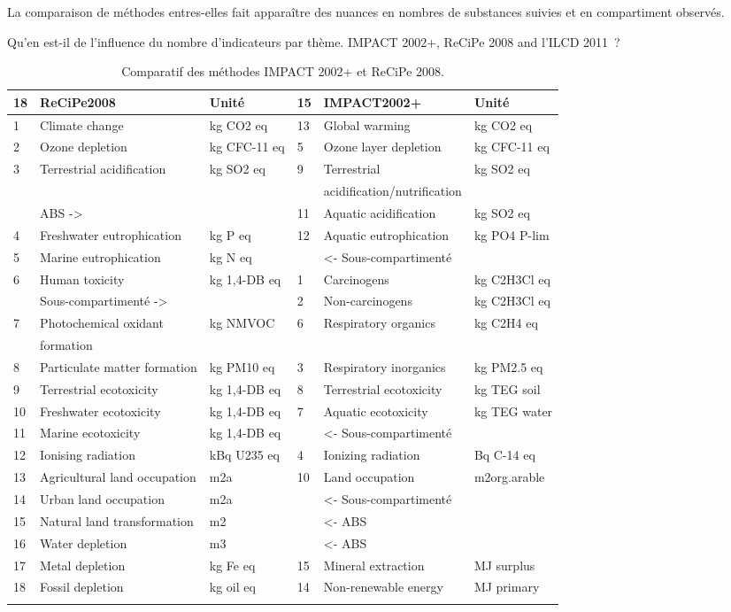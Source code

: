 La comparaison de méthodes entres-elles fait apparaître des nuances en nombres de substances suivies et en compartiment observés.

Qu'en est-il de l'influence du nombre d'indicateurs par thème.
IMPACT 2002+, ReCiPe 2008 and l'ILCD 2011~?~\cite{jolliet_impact_2003, goedkoop_recipe_2009}
    {\scriptsize
    \begin{longtable}{ l p{3cm} l l p{3cm} l}
    \hline
    18 & ReCiPe2008 & Unité & 15 & IMPACT2002+ & Unité  \\
    \hline
    1&Climate change&kg CO2 eq&13&Global warming&kg CO2 eq\\
    2&Ozone depletion&kg CFC-11 eq&5&Ozone layer depletion&kg CFC-11 eq\\
    3&Terrestrial acidification&kg SO2 eq&9&Terrestrial&kg SO2 eq\\
    &&&&acidification/nutrification\\
    &ABS -> &&11&Aquatic acidification&kg SO2 eq\\
    4&Freshwater eutrophication&kg P eq&12&Aquatic eutrophication&kg PO4 P-lim\\
    5&Marine eutrophication&kg N eq&&<- Sous-compartimenté&\\
    6&Human toxicity&kg 1,4-DB eq&1&Carcinogens&kg C2H3Cl eq\\
    &Sous-compartimenté -> &&2&Non-carcinogens&kg C2H3Cl eq\\
    7&Photochemical oxidant&kg NMVOC&6&Respiratory organics&kg C2H4 eq \\
    &formation\\
    8&Particulate matter formation&kg PM10 eq&3&Respiratory inorganics&kg PM2.5 eq\\
    9&Terrestrial ecotoxicity&kg 1,4-DB eq&8&Terrestrial ecotoxicity&kg TEG soil\\
    10&Freshwater ecotoxicity&kg 1,4-DB eq&7&Aquatic ecotoxicity&kg TEG water\\
    11&Marine ecotoxicity&kg 1,4-DB eq&&<- Sous-compartimenté&\\
    12&Ionising radiation&kBq U235 eq&4&Ionizing radiation&Bq C-14 eq\\
    13&Agricultural land occupation&m2a&10&Land occupation&m2org.arable\\
    14&Urban land occupation&m2a&&<- Sous-compartimenté&\\
    15&Natural land transformation&m2&&<- ABS&\\
    16&Water depletion&m3&&<- ABS&\\
    17&Metal depletion&kg Fe eq&15&Mineral extraction&MJ surplus\\
    18&Fossil depletion&kg oil eq&14&Non-renewable energy&MJ primary\\
    \hline
    \caption{Comparatif des méthodes IMPACT 2002+ et ReCiPe 2008.}
        \label{tab:ReCiPe2008 - IMAPCT2002+}
    \end{longtable}
    }

